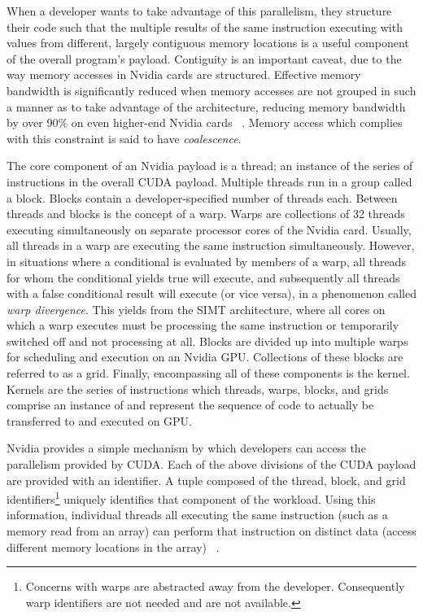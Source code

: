 \documentclass[letterpaper, 12pt]{article}
\let\supercite\cite
\renewcommand{\cite}[1]{\textnormal{~\supercite{#1}}}
\begin{document}
  When a developer wants to take advantage of this parallelism, they structure their code such that the multiple results of the same
  instruction executing with values from different, largely contiguous memory locations is a useful component of the overall 
  program's payload.  Contiguity is an important caveat, due to the way memory accesses in Nvidia cards are structured.  Effective
  memory bandwidth is significantly reduced when memory accesses are not grouped in such a manner as to take advantage of the 
  architecture, reducing memory bandwidth by over 90\% on even higher-end Nvidia cards \cite{coalesce}. Memory access which complies
  with this constraint is said to have \textit{coalescence}.

  The core component of an Nvidia payload is a thread; an instance of the series of instructions in the overall CUDA payload.
  Multiple threads run in a group called a block.  Blocks contain a developer-specified number of threads each.  Between threads and
  blocks is the concept of a warp.  Warps are collections of 32 threads executing simultaneously on separate processor cores of the
  Nvidia card.  Usually, all threads in a warp are executing the same instruction simultaneously. However, in situations where a 
  conditional is evaluated by members of a warp, all threads for whom the conditional yields true will execute, and subsequently all
  threads with a false conditional result will execute (or vice versa), in a phenomenon called \textit{warp divergence}.  This yields
  from the SIMT architecture, where all cores on which a warp executes must be processing the same instruction or temporarily 
  switched off and not processing at all.  Blocks are divided up into multiple warps for scheduling and execution on an Nvidia GPU.
  Collections of these blocks are referred to as a grid.  Finally, encompassing all of these components is the kernel.  Kernels are 
  the series of instructions which threads, warps, blocks, and grids comprise an instance of and represent the sequence of code to 
  actually be transferred to and executed on GPU.

  Nvidia provides a simple mechanism by which developers can access the parallelism provided by CUDA.  Each of the above divisions of 
  the CUDA payload are provided with an identifier.  A tuple composed of the thread, block, and grid identifiers\footnote{Concerns with
  warps are abstracted away from the developer.  Consequently warp identifiers are not needed and are not available.} uniquely 
  identifies that component of the workload.  Using this information, individual threads all executing the same instruction (such as a
  memory read from an array) can perform that instruction on distinct data (access different memory locations in the array) \cite{cuda}.
\end{document}
